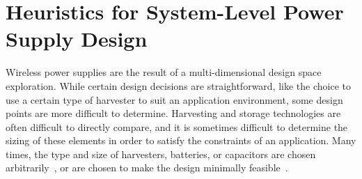 \chapter{
Heuristics for System-Level Power Supply Design 
}

\label{chap:intuition}

Wireless power supplies are the result of a multi-dimensional design space exploration.
While certain design decisions are straightforward, like the choice to use a certain type of harvester to suit an application environment, some design points are more difficult to determine. 
Harvesting and storage technologies are often difficult to directly compare, and it is sometimes difficult to determine the sizing of these elements in order to satisfy the constraints of an application. 
Many times, the type and size of harvesters, batteries, or capacitors are chosen arbitrarily~\cite{hamiltoniot,lee2013modular,juang2002energy}, or are chosen to make the design minimally feasible~\cite{yervaGrafting12,debruin2013monjolo,hesterFlicker17,afanasov2020battery}.

